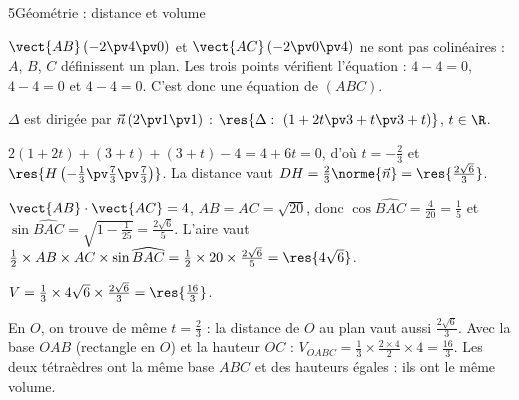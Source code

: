 \begin{corrigeBac}{5}{Géométrie : distance et volume}
\begin{questions}
  \item $\vect{AB}\,(-2\pv4\pv0)$ et $\vect{AC}\,(-2\pv0\pv4)$ ne sont pas colinéaires : $A$, $B$, $C$ définissent un plan. Les trois points
    vérifient l'équation : $4-4=0$, $4-4=0$ et $4-4=0$. C'est donc une équation de $(ABC)$. \pts{1 pt}
  \item $\Delta$ est dirigée par $\vec n\,(2\pv1\pv1)$ : $\res{\Delta:\ (1+2t\pv3+t\pv3+t)}$, $t\in\R$. 
  \item $2(1+2t)+(3+t)+(3+t)-4=4+6t=0$, d'où $t=-\frac23$ et $\res{H\left(-\tfrac13\pv\tfrac73\pv\tfrac73\right)}$. La distance vaut
    $DH=\frac23\norme{\vec n}=\res{\tfrac{2\sqrt6}{3}}$. \pts{1 pt}
  \item $\vect{AB}\cdot\vect{AC}=4$, $AB=AC=\sqrt{20}$, donc $\cos\widehat{BAC}=\frac4{20}=\frac15$ et
    $\sin\widehat{BAC}=\sqrt{1-\frac1{25}}=\frac{2\sqrt6}{5}$. L'aire vaut $\frac12\times AB\times AC\times\sin\widehat{BAC}
    =\frac12\times20\times\frac{2\sqrt6}{5}=\res{4\sqrt6}$. 
  \item $V=\frac13\times4\sqrt6\times\frac{2\sqrt6}{3}=\res{\tfrac{16}{3}}$. 
  \item En $O$, on trouve de même $t=\frac23$ : la distance de $O$ au plan vaut aussi $\frac{2\sqrt6}{3}$. Avec la base $OAB$ (rectangle
    en $O$) et la hauteur $OC$ : $V_{OABC}=\frac13\times\frac{2\times4}{2}\times4=\frac{16}{3}$. Les deux tétraèdres ont la même base
    $ABC$ et des hauteurs égales : ils ont le même volume. 
\end{questions}
\end{corrigeBac}

